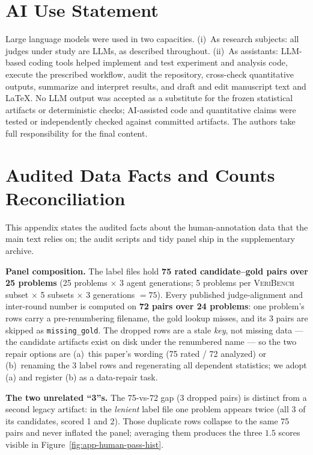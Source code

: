 \documentclass{article}
\begin{document}
\section*{AI Use Statement}
Large language models were used in two capacities.
(i)~As research subjects: all judges under study are LLMs, as described throughout.
(ii)~As assistants: LLM-based coding tools helped implement and test experiment and analysis code, execute the prescribed workflow, audit the repository, cross-check quantitative outputs, summarize and interpret results, and draft and edit manuscript text and \LaTeX.
No LLM output was accepted as a substitute for the frozen statistical artifacts or deterministic checks; AI-assisted code and quantitative claims were tested or independently checked against committed artifacts.
The authors take full responsibility for the final content.




\newpage
\appendix

\section{Audited Data Facts and Counts Reconciliation}\label{app:audit}

This appendix states the audited facts about the human-annotation data that the main text relies on; the audit scripts and tidy panel ship in the supplementary archive.

\textbf{Panel composition.}
The label files hold \textbf{75 rated candidate--gold pairs over 25 problems} (25 problems $\times$ 3 agent generations; 5 problems per \textsc{VeriBench} subset $\times$ 5 subsets $\times$ 3 generations $= 75$).
Every published judge-alignment and inter-round number is computed on \textbf{72 pairs over 24 problems}: one problem's rows carry a pre-renumbering filename, the gold lookup misses, and its 3 pairs are skipped as \texttt{missing\_gold}.
The dropped rows are a stale \emph{key}, not missing data --- the candidate artifacts exist on disk under the renumbered name --- so the two repair options are (a)~this paper's wording (75 rated / 72 analyzed) or (b)~renaming the 3 label rows and regenerating all dependent statistics; we adopt (a) and register (b) as a data-repair task.

\textbf{The two unrelated ``3''s.}
The 75-vs-72 gap (3 dropped pairs) is distinct from a second legacy artifact: in the \emph{lenient} label file one problem appears twice (all 3 of its candidates, scored 1 and 2).
Those duplicate rows collapse to the same 75 pairs and never inflated the panel; averaging them produces the three $1.5$ scores visible in Figure~\ref{fig:app-human-pass-hist}.
\end{document}
